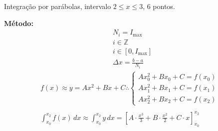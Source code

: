\documentclass[11pt]{homework}
\begin{document}
\begin{alphaparts}
        
        \newpage
        \questionpart Integração por parábolas, intervalo $2\leq x \leq 3$, 6 pontos.
        
        \textbf{Método:}
        \begin{align*}
            & N_i = I_\text{max}\\
            & i \in \mathbb{Z}\\
            & i \in [0, I_\text{max}]\\
            & \Delta x = \frac{b-a}{N_i}
        \end{align*}     
        \begin{gather*}
            f(x) \approx y = Ax^2 + Bx + C \therefore 
            \begin{cases}
            Ax_0^2 + Bx_0 + C = f(x_0) \\
            Ax_1^2 + Bx_1 + C = f(x_1) \\
            Ax_2^2 + Bx_2 + C = f(x_2)
            \end{cases}\\
            \\
            \int_{x_0}^{x_2} f(x) \,dx \approx \int_{x_0}^{x_2} y \,dx = \left[A \cdot \frac{x^3}{3} + B \cdot \frac{x^2}{2} + C \cdot x \right]_{x_0}^{x_2}
        \end{gather*}
        

\end{alphaparts}
\end{document}
